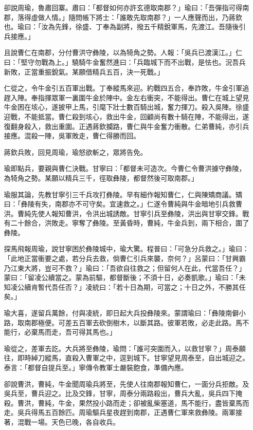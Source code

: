 卻說周瑜，魯肅回寨。肅曰：「都督如何亦許玄德取南郡？」瑜曰：「吾彈指可得南郡，落得虛做人情。」隨問帳下將士：「誰敢先取南郡？」一人應聲而出，乃蔣欽也。瑜曰：「汝為先鋒，徐盛、丁奉為副將，撥五千精銳軍馬，先渡江。吾隨後引兵接應。」

且說曹仁在南郡，分付曹洪守彝陵，以為犄角之勢。人報：「吳兵已渡漢江。」仁曰：「堅守勿戰為上。」驍騎牛金奮然進曰：「兵臨城下而不出戰，是怯也。況吾兵新敗，正當重振銳氣。某願借精兵五百，決一死戰。」

仁從之，令牛金引五百軍出戰。丁奉縱馬來迎。約戰四五合，奉詐敗，牛金引軍追趕入陣。奉指揮眾軍一裏圍牛金於陣中。金左右衝突，不能得出。曹仁在城上望見牛金困在垓心，遂披甲上馬，引麾下壯士數百騎出城，奮力揮刀。殺入吳陣。徐盛迎戰，不能抵當。曹仁殺到垓心，救出牛金，回顧尚有數十騎在陣，不能得出，遂復翻身殺入，救出重圍。正遇蔣欽攔路，曹仁與牛金奮力衝散。仁弟曹純，亦引兵接應。混殺一陣，吳軍敗走，曹仁得勝而回。

蔣欽兵敗，回見周瑜，瑜怒欲斬之，眾將告免。

瑜即點兵，要親與曹仁決戰。甘寧曰：「都督未可造次。今曹仁令曹洪據守彝陵，為犄角之勢。某願以精兵三千，徑取彝陵，都督然後可取南郡。」

瑜服其論，先教甘寧引三千兵攻打彝陵。早有細作報知曹仁，仁與陳矯商議。矯曰：「彝陵有失，南郡亦不可守矣。宜速救之。」仁遂令曹純與牛金暗地引兵救曹洪。曹純先使人報知曹洪，令洪出城誘敵。甘寧引兵至彝陵，洪出與甘寧交鋒。戰有二十餘合，洪敗走。寧奪了彝陵。至黃昏時，曹純，牛金兵到，兩下相合，圍了彝陵。

探馬飛報周瑜，說甘寧困於彝陵城中，瑜大驚。程普曰：「可急分兵救之。」瑜曰：「此地正當衝要之處，若分兵去救，倘曹仁引兵來襲，奈何？」呂蒙曰：「甘興霸乃江東大將，豈可不救？」瑜曰：「吾欲自往救之；但留何人在此，代當吾任？」蒙曰：「留凌公續當之。蒙為前驅，都督斷後；不須十日，必奏凱歌。」瑜曰：「未知凌公續肯暫代吾任否？」凌統曰：「若十日為期，可當之；十日之外，不勝其任矣。」

瑜大喜，遂留兵萬餘，付與凌統，即日起大兵投彝陵來。蒙謂瑜曰：「彝陵南僻小路，取南郡極便。可差五百軍去砍倒樹木，以斷其路。彼軍若敗，必走此路。馬不能行，必棄馬而走，吾可得其馬也。」

瑜從之，差軍去訖。大兵將至彝陵，瑜問：「誰可突圍而入，以救甘寧？」周泰願往，即時綽刀縱馬，直殺入曹軍之中，逕到城下。甘寧望見周泰至，自出城迎之。泰言：「都督自提兵至。」寧傳令教軍士嚴裝飽食，準備內應。

卻說曹洪，曹純，牛金聞周瑜兵將至，先使人往南郡報知曹仁，一面分兵拒敵。及吳兵至，曹兵迎之。比及交鋒，甘寧，周泰分兩路殺出，曹兵大亂，吳兵四下掩殺。曹洪，曹純，牛金，果然投小路而走；卻被亂柴塞道，馬不能行，盡皆棄馬而走。吳兵得馬五百餘匹。周瑜驅兵星夜趕到南郡，正遇曹仁軍來救彝陵。兩軍接著，混戰一場。天色已晚，各自收兵。

